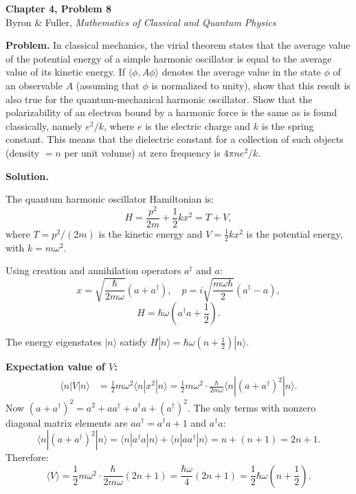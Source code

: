 \documentclass[12pt]{article}
\begin{document}
\begin{center}
{\Large\bfseries Chapter 4, Problem 8}\\[6pt]
Byron \& Fuller, \textit{Mathematics of Classical and Quantum Physics}
\end{center}

\bigskip

\textbf{Problem.} In classical mechanics, the virial theorem states that the average value of the potential energy of a simple harmonic oscillator is equal to the average value of its kinetic energy. If $\langle\phi, A\phi\rangle$ denotes the average value in the state $\phi$ of an observable $A$ (assuming that $\phi$ is normalized to unity), show that this result is also true for the quantum-mechanical harmonic oscillator. Show that the polarizability of an electron bound by a harmonic force is the same as is found classically, namely $e^2/k$, where $e$ is the electric charge and $k$ is the spring constant. This means that the dielectric constant for a collection of such objects (density $= n$ per unit volume) at zero frequency is $4\pi n e^2/k$.

\bigskip
\textbf{Solution.}

The quantum harmonic oscillator Hamiltonian is:
\[
H = \frac{p^2}{2m} + \frac{1}{2}kx^2 = T + V,
\]
where $T = p^2/(2m)$ is the kinetic energy and $V = \frac{1}{2}kx^2$ is the potential energy, with $k = m\omega^2$.

Using creation and annihilation operators $a^\dagger$ and $a$:
\[
x = \sqrt{\frac{\hbar}{2m\omega}}(a + a^\dagger), \quad p = i\sqrt{\frac{m\omega\hbar}{2}}(a^\dagger - a),
\]
\[
H = \hbar\omega\left(a^\dagger a + \frac{1}{2}\right).
\]

The energy eigenstates $|n\rangle$ satisfy $H|n\rangle = \hbar\omega(n + \tfrac{1}{2})|n\rangle$.

\textbf{Expectation value of $V$:}
\begin{align*}
\langle n|V|n\rangle &= \frac{1}{2}m\omega^2 \langle n|x^2|n\rangle = \frac{1}{2}m\omega^2 \cdot \frac{\hbar}{2m\omega}\langle n|(a+a^\dagger)^2|n\rangle.
\end{align*}
Now $(a+a^\dagger)^2 = a^2 + aa^\dagger + a^\dagger a + (a^\dagger)^2$. The only terms with nonzero diagonal matrix elements are $aa^\dagger = a^\dagger a + 1$ and $a^\dagger a$:
\[
\langle n|(a+a^\dagger)^2|n\rangle = \langle n|a^\dagger a|n\rangle + \langle n|aa^\dagger|n\rangle = n + (n+1) = 2n+1.
\]
Therefore:
\[
\langle V\rangle = \frac{1}{2}m\omega^2 \cdot \frac{\hbar}{2m\omega}(2n+1) = \frac{\hbar\omega}{4}(2n+1) = \frac{1}{2}\hbar\omega\left(n + \frac{1}{2}\right).
\]
\end{document}
